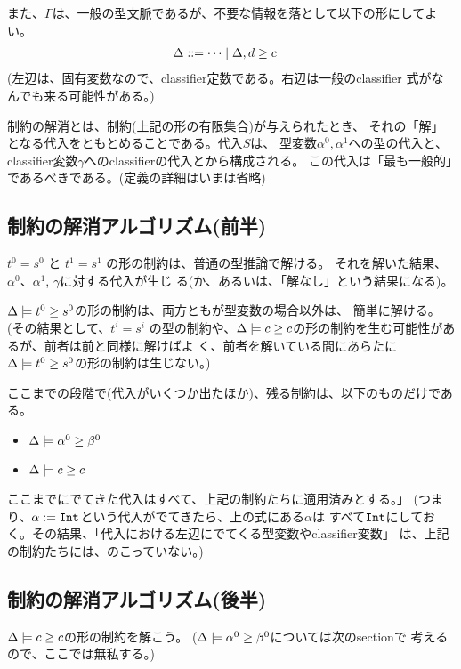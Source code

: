 また、$\Gamma$は、一般の型文脈であるが、不要な情報を落として以下の形にしてよい。
\begin{align*}
  \Delta & ::= \cdots \mid \Delta,{d} \ge {c}
\end{align*}
(左辺は、固有変数なので、classifier定数である。右辺は一般のclassifier
式がなんでも来る可能性がある。)

制約の解消とは、制約(上記の形の有限集合)が与えられたとき、
それの「解」となる代入をともとめることである。代入$S$は、
型変数$\alpha^0, \alpha^1$への型の代入と、
classifier変数$\gamma$へのclassifierの代入とから構成される。
この代入は「最も一般的」であるべきである。(定義の詳細はいまは省略)

\subsection{制約の解消アルゴリズム(前半)}

$t^0=s^0$ と $t^1=s^1$ の形の制約は、普通の型推論で解ける。
それを解いた結果、$\alpha^0$、$\alpha^1$, $\gamma$に対する代入が生じ
る(か、あるいは、「解なし」という結果になる)。

$\Delta \models {t^0} \ge {s^0}$の形の制約は、両方ともが型変数の場合以外は、
簡単に解ける。(その結果として、$t^i=s^i$ の型の制約や、$\Delta \models
{c} \ge {c}$の形の制約を生む可能性があるが、前者は前と同様に解けばよ
く、前者を解いている間にあらたに$\Delta \models {t^0} \ge {s^0}$の形の制約は生じない。)

ここまでの段階で(代入がいくつか出たほか)、残る制約は、以下のものだけである。

\begin{itemize}
\item $\Delta \models {\alpha^0} \ge {\beta^0}$
\item $\Delta \models {c} \ge {c}$
\end{itemize}

ここまでにでてきた代入はすべて、上記の制約たちに適用済みとする。」
(つまり、$\alpha:=\mbox{\texttt{Int}}$という代入がでてきたら、上の式にある$\alpha$は
すべて$\mbox{\texttt{Int}}$にしておく。その結果、「代入における左辺にでてくる型変数やclassifier変数」
は、上記の制約たちには、のこっていない。)


\subsection{制約の解消アルゴリズム(後半)}

$\Delta \models {c} \ge {c}$の形の制約を解こう。
($\Delta \models {\alpha^0} \ge {\beta^0}$については次のsectionで
考えるので、ここでは無私する。)

